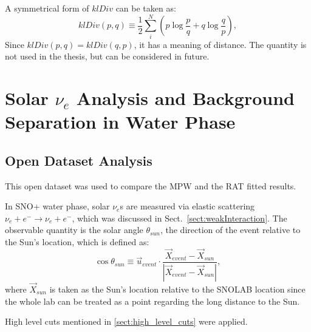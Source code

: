 A symmetrical form of $klDiv$ can be taken as:
\begin{equation}
klDiv(p,q) \equiv \frac{1}{2}\sum_{i}^N (p\log{\frac{p}{q}}+q\log{\frac{q}{p}}),
\end{equation}
Since $klDiv(p,q)=klDiv(q,p)$, it has a meaning of distance. The quantity is not used in the thesis, but can be considered in future.

\section{Solar \texorpdfstring{$\nu_e$}{Lg} Analysis and Background Separation in Water Phase}
\subsection{Open Dataset Analysis}
This open dataset was used to compare the MPW and the RAT fitted results.

In SNO+ water phase, solar $\nu_e$s are measured via elastic scattering $\nu_e+e^-\to \nu_e+e^-$, which was discussed in Sect.~\ref{sect:weakInteraction}. The observable quantity is the solar angle $\theta_{sun}$, the direction of the event relative to the Sun's location, which is defined as:
\begin{equation}
\cos\theta_{sun}\equiv \vec u_{event}\cdot \frac{\vec{X}_{event}-\vec{X}_{sun}}{|\vec{X}_{event}-\vec{X}_{sun}|},
\end{equation}
where $\vec{X}_{sun}$ is taken as the Sun's location relative to the SNOLAB location since the whole lab can be treated as a point regarding the long distance to the Sun. 

High level cuts mentioned in \ref{sect:high_level_cuts} were applied.

